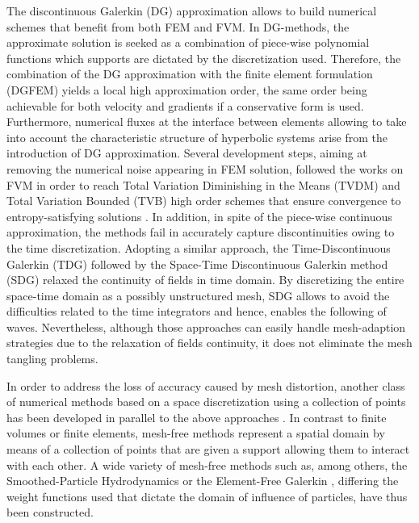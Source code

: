 The discontinuous Galerkin (DG) approximation \cite{NeutronDG} allows to build numerical schemes that benefit from both FEM and FVM.
In DG-methods, the approximate solution is seeked as a combination of piece-wise polynomial functions which supports are dictated by the discretization used.
Therefore, the combination of the DG approximation with the finite element formulation (DGFEM) yields a local high approximation order, the same order being achievable for both velocity and gradients if a conservative form is used.
Furthermore, numerical fluxes at the interface between elements allowing to take into account the characteristic structure of hyperbolic systems arise from the introduction of DG approximation.
Several development steps, aiming at removing the numerical noise appearing in FEM solution, followed the works on FVM in order to reach Total Variation Diminishing in the Means (TVDM) and Total Variation Bounded (TVB) high order schemes that ensure convergence to entropy-satisfying solutions \cite{Cockburn}.
In addition, in spite of the piece-wise continuous approximation, the methods fail in accurately capture discontinuities owing to the time discretization.
Adopting a similar approach, the Time-Discontinuous Galerkin (TDG) \cite{Hughes_TDG} followed by the Space-Time Discontinuous Galerkin method (SDG) \cite{ST_DGFEM1} relaxed the continuity of fields in time domain. 
By discretizing the entire space-time domain as a possibly unstructured mesh, SDG allows to avoid the difficulties related to the time integrators and hence, enables the following of waves.
Nevertheless, although those approaches can easily handle mesh-adaption strategies due to the relaxation of fields continuity, it does not eliminate the mesh tangling problems.

In order to address the loss of accuracy caused by mesh distortion, another class of numerical methods based on a space discretization using a collection of points has been developed in parallel to the above approaches \cite{Belytschko_Meshless,Meshless}.
In contrast to finite volumes or finite elements, mesh-free methods represent a spatial domain by means of a collection of points that are given a support allowing them to interact with each other.
A wide variety of mesh-free methods such as, among others, the Smoothed-Particle Hydrodynamics \cite{SPH} or the Element-Free Galerkin \cite{Belytschko_EFG}, differing the weight functions used that dictate the domain of influence of particles, have thus been constructed.

